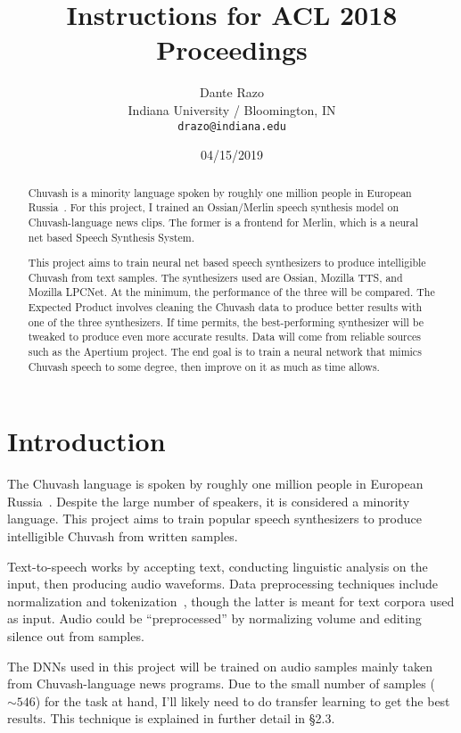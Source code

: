 \documentclass[11pt,a4paper]{article}
\title{Instructions for ACL 2018 Proceedings}
\author{Dante Razo \\
  Indiana University / Bloomington, IN \\
  {\tt drazo@indiana.edu} \\}
\date{04/15/2019}
\begin{document}
\maketitle
\begin{abstract}
  Chuvash is a minority language spoken by roughly one million people in European Russia~\cite{RBS:12}. For this project, I trained an Ossian/Merlin speech synthesis model on Chuvash-language news clips. The former is a frontend for Merlin, which is a neural net based Speech Synthesis System.
  
  
  This project aims to train neural net based speech synthesizers to produce intelligible Chuvash from text samples. The synthesizers used are Ossian, Mozilla TTS, and Mozilla LPCNet. At the minimum, the performance of the three will be compared. The Expected Product involves cleaning the Chuvash data to produce better results with one of the three synthesizers. If time permits, the best-performing synthesizer will be tweaked to produce even more accurate results. Data will come from reliable sources such as the Apertium project. The end goal is to train a neural network that mimics Chuvash speech to some degree, then improve on it as much as time allows.
\end{abstract}

\section{Introduction}
\label{sect:intro}
The Chuvash language is spoken by roughly one million people in European Russia~\cite{RBS:12}. Despite the large number of speakers, it is considered a minority language. This project aims to train popular speech synthesizers to produce intelligible Chuvash from written samples.



Text-to-speech works by accepting text, conducting linguistic analysis on the input, then producing audio waveforms. Data preprocessing techniques include normalization and tokenization~\cite{wiki-lexanalysis}, though the latter is meant for text corpora used as input. Audio could be ``preprocessed'' by normalizing volume and editing silence out from samples.

The DNNs used in this project will be trained on audio samples mainly taken from Chuvash-language news programs. Due to the small number of samples ($\sim546$) for the task at hand, I'll likely need to do transfer learning to get the best results. This technique is explained in further detail in \S2.3.
\end{document}
